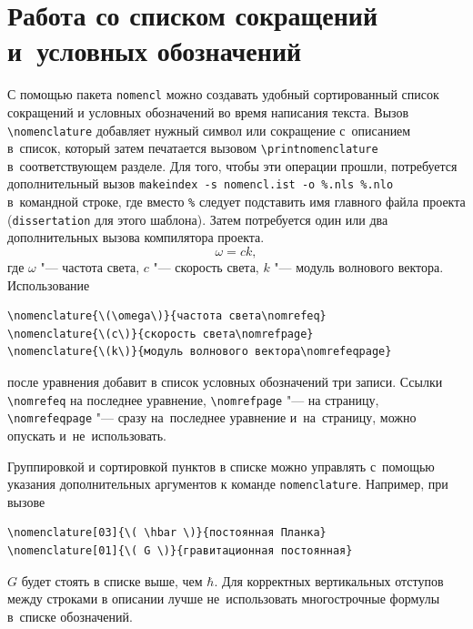 \section{Работа со списком сокращений и~условных обозначений}\label{sec:acronyms}

С помощью пакета \texttt{nomencl} можно создавать удобный сортированный список
сокращений и условных обозначений во время написания текста. Вызов
\verb+\nomenclature+ добавляет нужный символ или сокращение с~описанием
в~список, который затем печатается вызовом \verb+\printnomenclature+
в~соответствующем разделе.
Для того, чтобы эти операции прошли, потребуется дополнительный вызов
\verb+makeindex -s nomencl.ist -o %.nls %.nlo+ в~командной строке, где вместо
\verb+%+ следует подставить имя главного файла проекта (\verb+dissertation+
для этого шаблона).
Затем потребуется один или два дополнительных вызова компилятора проекта.
\begin{equation}
    \omega = c k,
\end{equation}
где \( \omega \) "--- частота света, \( c \) "--- скорость света, \( k \) "---
модуль волнового вектора.
Использование
\begin{verbatim}
\nomenclature{\(\omega\)}{частота света\nomrefeq}
\nomenclature{\(c\)}{скорость света\nomrefpage}
\nomenclature{\(k\)}{модуль волнового вектора\nomrefeqpage}
\end{verbatim}
после уравнения добавит в список условных обозначений три записи.
Ссылки \verb+\nomrefeq+ на последнее уравнение, \verb+\nomrefpage+ "--- на
страницу, \verb+\nomrefeqpage+ "--- сразу на~последнее уравнение и~на~страницу,
можно опускать и~не~использовать.

Группировкой и сортировкой пунктов в списке можно управлять с~помощью указания
дополнительных аргументов к команде \verb+nomenclature+.
Например, при вызове
\begin{verbatim}
\nomenclature[03]{\( \hbar \)}{постоянная Планка}
\nomenclature[01]{\( G \)}{гравитационная постоянная}
\end{verbatim}
\( G \) будет стоять в списке выше, чем \( \hbar \).
Для корректных вертикальных отступов между строками в описании лучше
не~использовать многострочные формулы в~списке обозначений.

